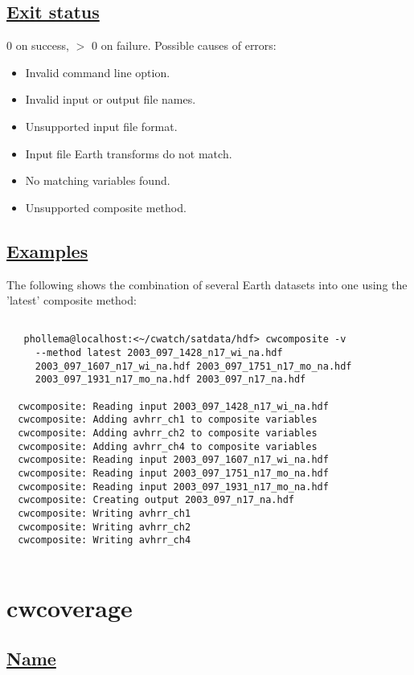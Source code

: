 \subsection*{\underline{Exit status}}


  0 on success, $>$ 0 on failure. Possible causes of errors: \begin{itemize}
\item  Invalid command line option. 
\item  Invalid input or output file names. 
\item  Unsupported input file format. 
\item  Input file Earth transforms do not match. 
\item  No matching variables found. 
\item  Unsupported composite method. 

\end{itemize}

\subsection*{\underline{Examples}}


  The following shows the combination of several Earth datasets into one using the 'latest' composite method: \begin{verbatim}

   phollema@localhost:<~/cwatch/satdata/hdf> cwcomposite -v
     --method latest 2003_097_1428_n17_wi_na.hdf
     2003_097_1607_n17_wi_na.hdf 2003_097_1751_n17_mo_na.hdf
     2003_097_1931_n17_mo_na.hdf 2003_097_n17_na.hdf

  cwcomposite: Reading input 2003_097_1428_n17_wi_na.hdf
  cwcomposite: Adding avhrr_ch1 to composite variables
  cwcomposite: Adding avhrr_ch2 to composite variables
  cwcomposite: Adding avhrr_ch4 to composite variables
  cwcomposite: Reading input 2003_097_1607_n17_wi_na.hdf
  cwcomposite: Reading input 2003_097_1751_n17_mo_na.hdf
  cwcomposite: Reading input 2003_097_1931_n17_mo_na.hdf
  cwcomposite: Creating output 2003_097_n17_na.hdf
  cwcomposite: Writing avhrr_ch1
  cwcomposite: Writing avhrr_ch2
  cwcomposite: Writing avhrr_ch4
 
\end{verbatim}


\newpage
\section{cwcoverage} \hypertarget{cwcoverage}{}
\subsection*{\underline{Name}}


